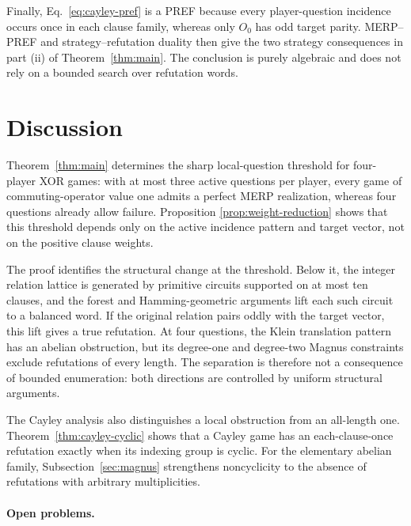 \documentclass[11pt]{article}
\theoremstyle{definition}
\theoremstyle{remark}
\numberwithin{equation}{section}
\begin{document}
Finally, Eq.~\eqref{eq:cayley-pref} is a PREF because every player-question
incidence occurs once in each clause family, whereas only \(O_0\) has odd
target parity.  MERP--PREF and strategy--refutation duality then give the two
strategy consequences in part (ii) of Theorem~\ref{thm:main}.  The conclusion
is purely algebraic and does not rely on a bounded search over refutation
words.

\section{Discussion}\label{sec:discussion}

Theorem~\ref{thm:main} determines the sharp local-question threshold for
four-player XOR games: with at most three active questions per player, every
game of commuting-operator value one admits a perfect MERP realization,
whereas four questions already allow failure.  Proposition
\ref{prop:weight-reduction} shows that this threshold depends only on the
active incidence pattern and target vector, not on the positive clause
weights.

The proof identifies the structural change at the threshold.  Below it, the
integer relation lattice is generated by primitive circuits supported on at
most ten clauses, and the forest and Hamming-geometric arguments lift each
such circuit to a balanced word.  If the original relation pairs oddly with
the target vector, this lift gives a true refutation.  At four questions, the
Klein translation pattern has an abelian obstruction, but its degree-one and
degree-two Magnus constraints exclude refutations of every length.  The
separation is therefore not a consequence of bounded enumeration: both
directions are controlled by uniform structural arguments.

The Cayley analysis also distinguishes a local obstruction from an all-length
one.  Theorem~\ref{thm:cayley-cyclic} shows that a Cayley game has an
each-clause-once refutation exactly when its indexing group is cyclic.  For the
elementary abelian family, Subsection~\ref{sec:magnus} strengthens
noncyclicity to the absence of refutations with arbitrary multiplicities.

\paragraph{Open problems.}
\end{document}
